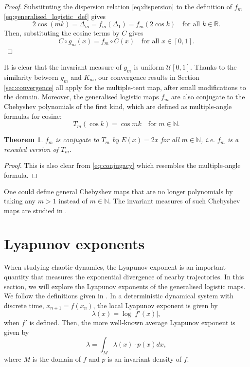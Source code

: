 \documentclass[a4paper]{article}
\newtheorem{theorem}{Theorem}%
\theoremstyle{definition}
\numberwithin{equation}{section}
\numberwithin{theorem}{section}
\begin{document}
{\begin{proof}
    Substituting the dispersion relation \eqref{eq:dispersion} to the definition of $f_m$ \eqref{eq:generalised_logistic_def} gives
    \begin{equation} \label{eq:conjugacy}
        2\cos(mk) = \Delta_m = f_m(\Delta_1) = f_m(2\cos k)\quad\text{for all $k\in\mathbb{R}$.}
    \end{equation}
    Then, substituting the cosine terms by $C$ gives
    \begin{equation*}
        C\circ g_m(x) = f_m\circ C(x)\quad\text{for all $x\in[0,1]$.}
    \end{equation*}
\end{proof}

It is clear that the invariant measure of $g_m$ is uniform $\mathcal{U}[0,1]$. Thanks to the similarity between $g_m$ and $K_m$, our convergence results in Section \ref{sec:convergence} all apply for the multiple-tent map, after small modifications to the domain. Moreover, the generalised logistic maps $f_m$ are also conjugate to the Chebyshev polynomials of the first kind, which are defined as multiple-angle formulas for cosine:
\begin{equation*}
    T_m(\cos k) = \cos{mk}\quad\text{for $m\in\mathbb{N}$}.
\end{equation*}

\begin{theorem}
    $f_m$ is conjugate to $T_m$ by $E(x) = 2x$ for all $m\in\mathbb{N}$, i.e. $f_m$ is a rescaled version of $T_m$.
\end{theorem}
\begin{proof}
    This is also clear from \eqref{eq:conjugacy} which resembles the multiple-angle formula.
\end{proof}

One could define general Chebyshev maps that are no longer polynomials by taking any $m>1$ instead of $m\in\mathbb{N}$. The invariant measures of such Chebyshev maps are studied in \cite{boyarsky2001invariant}.

\section{Lyapunov exponents} \label{sec:lyapunov}

When studying chaotic dynamics, the Lyapunov exponent is an important quantity that 
measures the exponential divergence of nearby trajectories. In this section, we will explore the Lyapunov exponents of the generalised logistic maps. We follow the definitions given in \cite{hilborn2000quantifying}. In a deterministic dynamical system with discrete time, $x_{n+1}=f(x_n)$, the local Lyapunov exponent is given by
\begin{equation*}
    \lambda(x) = \log |f'(x)|,
\end{equation*}
when $f'$ is defined. Then, the more well-known average Lyapunov exponent is given by
\begin{equation} \label{eq:average_lyapunov}
    \lambda = \int_M\lambda(x)\cdot p(x)dx,
\end{equation}
where $M$ is the domain of $f$ and $p$ is an invariant density of $f$.

}
\end{document}
